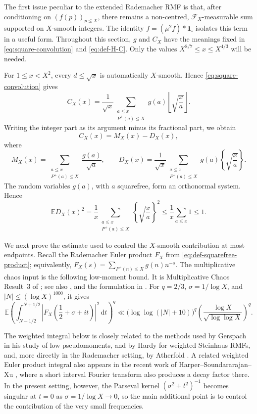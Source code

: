 \documentclass[a4paper,12pt,reqno]{amsart}
\numberwithin{equation}{section}
\theoremstyle{remark}
\newcommand{\E}{\mathbb{E}}
\begin{document}
The first issue peculiar to the extended Rademacher RMF is that,
after conditioning on $(f(p))_{p\leq X}$, there remains a non-centred,
$\mathscr F_X$-measurable sum supported on $X$-smooth integers. The identity
$f=(\mu^2f)*\mathbf 1_{\square}$ isolates this term in a useful form.
Throughout this section, $g$ and $C_X$ have the meanings fixed in
\eqref{eq:square-convolution} and \eqref{eq:def-H-C}.
Only the values $X^{8/7}\leq x\leq X^{4/3}$ will be needed. 

For $1\leq x<X^2$, every $d\leq\sqrt x$ is automatically $X$-smooth.
Hence \eqref{eq:square-convolution} gives
\[
 C_X(x)=\frac1{\sqrt x}
 \sum_{\substack{a\leq x\\P^+(a)\leq X}}g(a)
 \left\lfloor\sqrt{\frac xa}\right\rfloor.
\]
Writing the integer part as its argument minus its fractional part, we
obtain
\[
 C_X(x)=M_X(x)-D_X(x),
\]
where
\[
 M_X(x)=\sum_{\substack{a\leq x\\P^+(a)\leq X}}\frac{g(a)}{\sqrt a},
 \qquad
 D_X(x)=\frac{1}{\sqrt x}
 \sum_{\substack{a\leq x\\P^+(a)\leq X}}g(a)
 \left\{\sqrt{\frac xa}\right\}.
\]
The random variables $g(a)$, with $a$ squarefree, form an orthonormal
system. Hence
\[
 \E D_X(x)^2=\frac1x
 \sum_{\substack{a\leq x\\P^+(a)\leq X}}
 \left\{\sqrt{\frac xa}\right\}^{\!2}
 \leq\frac1x\sum_{a\leq x}1\leq1.
\]



We next prove the estimate used to control the $X$-smooth contribution at
most endpoints. Recall the Rademacher Euler product $F_X$ from
\eqref{eq:def-squarefree-product}; equivalently,
$F_X(s)=\sum_{P^+(n)\leq X}g(n)n^{-s}$.
The multiplicative chaos input is the following low-moment
bound.  It is Multiplicative Chaos Result~3 of
\cite{Harper2023Large}; see also \cite[Key Proposition~3 and the discussion
following it]{Harper2020Low}, and the formulation in
\cite[Proposition~2.9]{Atherfold2025}.  For $q=2/3$,
$\sigma=1/\log X$, and $|N|\leq(\log X)^{1000}$, it gives
\begin{equation}\label{eq:mc3-old}
 \E\left(\int_{N-1/2}^{N+1/2}
 \left|F_X\left(\frac12+\sigma+it\right)\right|^2\,\mathrm{d}t
 \right)^q
 \ll \bigl(\log\log(|N|+10)\bigr)^q
 \left(\frac{\log X}{\sqrt{\log\log X}}\right)^q.
\end{equation}



{The weighted integral below is closely related  to the methods used by
Gerspach \cite{Gerspach2022} in his study of low pseudomoments, and by Hardy \cite{Hardy2024Weighted} for weighted Steinhaus RMFs, and, more directly in the Rademacher setting, by Atherfold  \cite{Atherfold2025}.} A related weighted Euler product integral also appears in the recent work of Harper--Soundararajan--Xu \cite[Section~2]{HarperSoundararajanXu2026},
where a short interval Fourier transform also produces a decay factor
there.  In the present setting, however, the Parseval kernel
\((\sigma^2+t^2)^{-1}\) becomes singular at \(t=0\) as
\(\sigma=1/\log X\to0\), so the main additional point is to control
the contribution of the very small frequencies.
\end{document}
